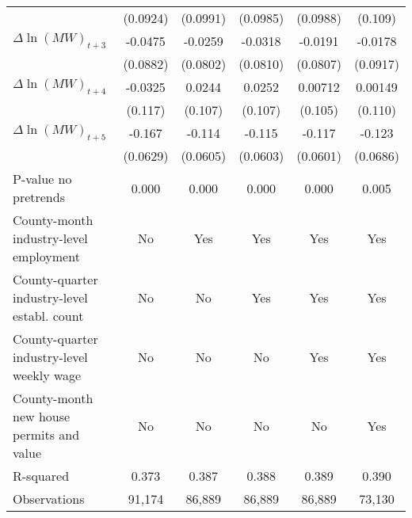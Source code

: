 {\begin{tabular}{l*{5}{c}}
          & (0.0924)         & (0.0991)         & (0.0985)         & (0.0988)         &  (0.109)         \\
[1em]
$\Delta \ln(MW)_{t+3}$&  -0.0475         &  -0.0259         &  -0.0318         &  -0.0191         &  -0.0178         \\
          & (0.0882)         & (0.0802)         & (0.0810)         & (0.0807)         & (0.0917)         \\
[1em]
$\Delta \ln(MW)_{t+4}$&  -0.0325         &   0.0244         &   0.0252         &  0.00712         &  0.00149         \\
          &  (0.117)         &  (0.107)         &  (0.107)         &  (0.105)         &  (0.110)         \\
[1em]
$\Delta \ln(MW)_{t+5}$&   -0.167\sym{**} &   -0.114\sym{*}  &   -0.115\sym{*}  &   -0.117\sym{*}  &   -0.123\sym{*}  \\
          & (0.0629)         & (0.0605)         & (0.0603)         & (0.0601)         & (0.0686)         \\
\hline
P-value no pretrends&    0.000         &    0.000         &    0.000         &    0.000         &    0.005         \\
County-month industry-level employment&       No         &      Yes         &      Yes         &      Yes         &      Yes         \\
County-quarter industry-level establ. count&       No         &       No         &      Yes         &      Yes         &      Yes         \\
County-quarter industry-level weekly wage&       No         &       No         &       No         &      Yes         &      Yes         \\
County-month new house permits and value&       No         &       No         &       No         &       No         &      Yes         \\
R-squared &    0.373         &    0.387         &    0.388         &    0.389         &    0.390         \\
Observations&   91,174         &   86,889         &   86,889         &   86,889         &   73,130         \\
\hline\hline
\end{tabular}
}
